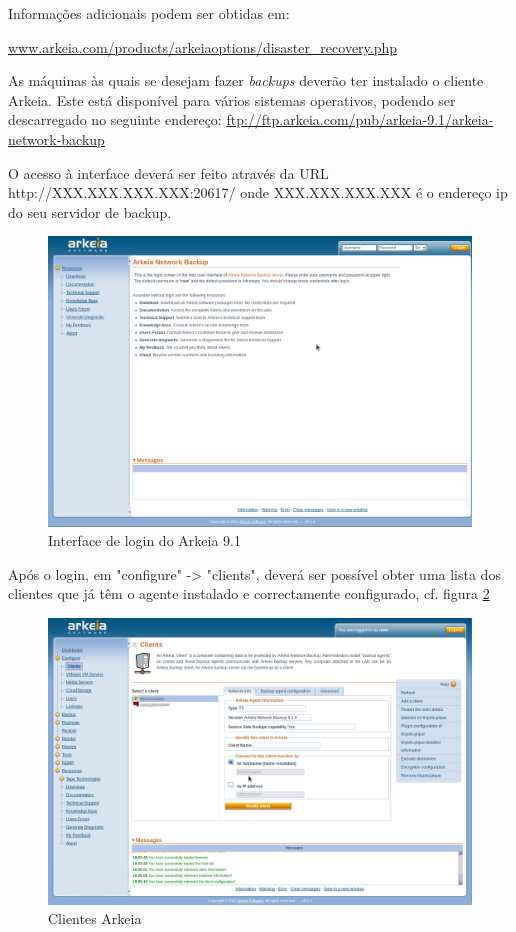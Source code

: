 Informações adicionais podem ser obtidas em:\\ \begin{normalsize}\sffamily\href{http://www.arkeia.com/products/arkeiaoptions/disaster\_recovery.php}{www.arkeia.com/products/arkeiaoptions/disaster\_recovery.php}\end{normalsize}

As máquinas às quais se desejam fazer \textit{backups} deverão ter instalado o cliente Arkeia. Este está disponível para vários sistemas operativos, podendo ser descarregado no seguinte endereço: \url{ftp://ftp.arkeia.com/pub/arkeia-9.1/arkeia-network-backup}

O acesso à interface deverá ser feito através da URL http://XXX.XXX.XXX.XXX:20617/ onde XXX.XXX.XXX.XXX é o endereço ip do seu servidor de backup.

\begin{figure}[H]
    \begin{center}
        \includegraphics[width=15cm]{include/img/arkeia1.png}
    \end{center}
    \caption{Interface de login do Arkeia 9.1}
    \label{fig:arkeia1}
\end{figure}

Após o login, em "configure" -> "clients", deverá ser possível obter uma lista dos clientes que já têm o agente instalado e correctamente configurado, cf. figura \ref{fig:arkeia2}

\begin{figure}[H]
    \begin{center}
        \includegraphics[width=15cm]{include/img/arkeia2.png}
    \end{center}
    \caption{Clientes Arkeia}
    \label{fig:arkeia2}
\end{figure}
